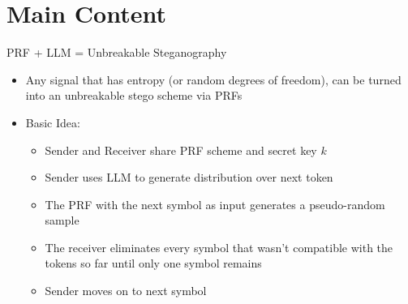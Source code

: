 \documentclass[8pt]{beamer}
\begin{document}
\section{Main Content}

\begin{frame}{PRF + LLM = Unbreakable Steganography}

    \begin{itemize}
        \item Any signal that has entropy (or random degrees of freedom), can be turned into an unbreakable stego scheme via PRFs
        \item Basic Idea:
        \begin{itemize}
            \item Sender and Receiver share PRF scheme and secret key $k$
            \item Sender uses LLM to generate distribution over next token
            \item The PRF with the next symbol as input generates a pseudo-random sample
            \item The receiver eliminates every symbol that wasn't compatible with the tokens so far until only one symbol remains
            \item Sender moves on to next symbol
        \end{itemize}
    \end{itemize}


\begin{figure}
    \centering
{}
\end{figure}
\end{frame}
\end{document}
